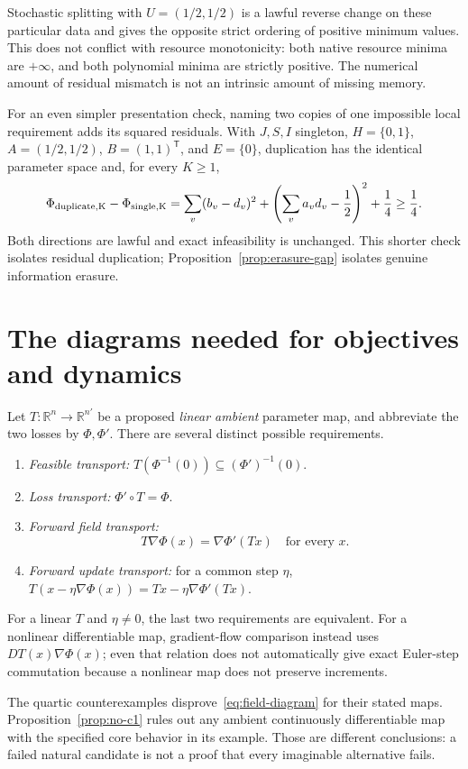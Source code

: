 \documentclass[11pt]{article}
\newcommand{\R}{\mathbb R}
\theoremstyle{remark}
\begin{document}
Stochastic splitting with $U=(1/2,1/2)$ is a lawful reverse change on these particular data and gives the opposite strict ordering of positive minimum values. This does not conflict with resource monotonicity: both native resource minima are $+\infty$, and both polynomial minima are strictly positive. The numerical amount of residual mismatch is not an intrinsic amount of missing memory.

For an even simpler presentation check, naming two copies of one impossible local requirement adds its squared residuals. With $J,S,I$ singleton, $H=\{0,1\}$, $A=(1/2,1/2)$, $B=(1,1)^{\mathsf T}$, and $E=\{0\}$, duplication has the identical parameter space and, for every $K\ge1$,
\[
 \Phi_{\rm duplicate,K}-\Phi_{\rm single,K}
 =\sum_v(b_v-d_v)^2+
       \left(\sum_va_vd_v-\frac12\right)^2+\frac14\ge\frac14.
\]
Both directions are lawful and exact infeasibility is unchanged. This shorter check isolates residual duplication; Proposition~\ref{prop:erasure-gap} isolates genuine information erasure.

\section{The diagrams needed for objectives and dynamics}\label{sec:diagrams}
Let $T:\R^n\to\R^{n'}$ be a proposed \emph{linear ambient} parameter map, and abbreviate the two losses by $\Phi,\Phi'$. There are several distinct possible requirements.
\begin{enumerate}
\item \emph{Feasible transport:} $T(\Phi^{-1}(0))\subseteq(\Phi')^{-1}(0)$.
\item \emph{Loss transport:} $\Phi'\circ T=\Phi$.
\item \emph{Forward field transport:}
\begin{equation}\label{eq:field-diagram}
 T\nabla\Phi(x)=\nabla\Phi'(Tx)\quad\text{for every }x.
\end{equation}
\item \emph{Forward update transport:} for a common step $\eta$,
$T(x-\eta\nabla\Phi(x))=Tx-\eta\nabla\Phi'(Tx)$.
\end{enumerate}
For a linear $T$ and $\eta\ne0$, the last two requirements are equivalent. For a nonlinear differentiable map, gradient-flow comparison instead uses $DT(x)\nabla\Phi(x)$; even that relation does not automatically give exact Euler-step commutation because a nonlinear map does not preserve increments.

The quartic counterexamples disprove~\eqref{eq:field-diagram} for their stated maps. Proposition~\ref{prop:no-c1} rules out any ambient continuously differentiable map with the specified core behavior in its example. Those are different conclusions: a failed natural candidate is not a proof that every imaginable alternative fails.
\end{document}
